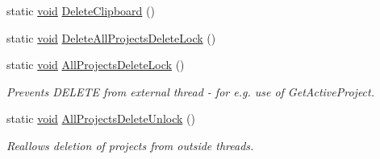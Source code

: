 \begin{DoxyCompactItemize}
\item 
static \hyperlink{sound_8c_ae35f5844602719cf66324f4de2a658b3}{void} \hyperlink{class_audacity_project_a5b710f2cacfc84546519e01aadc13a0c}{Delete\+Clipboard} ()
\item 
static \hyperlink{sound_8c_ae35f5844602719cf66324f4de2a658b3}{void} \hyperlink{class_audacity_project_af592e9483c612ec36c973189acf10055}{Delete\+All\+Projects\+Delete\+Lock} ()
\item 
static \hyperlink{sound_8c_ae35f5844602719cf66324f4de2a658b3}{void} \hyperlink{class_audacity_project_a66167817d6645121d0bef796d32368cb}{All\+Projects\+Delete\+Lock} ()
\begin{DoxyCompactList}\small\item\em Prevents D\+E\+L\+E\+TE from external thread -\/ for e.\+g. use of Get\+Active\+Project. \end{DoxyCompactList}\item 
static \hyperlink{sound_8c_ae35f5844602719cf66324f4de2a658b3}{void} \hyperlink{class_audacity_project_a54a02858f8e34c2cda5eb9b3f3ff0522}{All\+Projects\+Delete\+Unlock} ()
\begin{DoxyCompactList}\small\item\em Reallows deletion of projects from outside threads. \end{DoxyCompactList}\end{DoxyCompactItemize}
